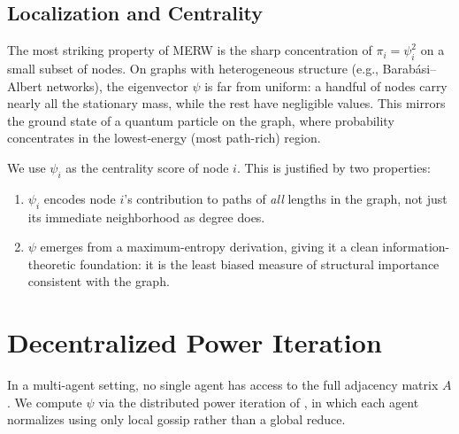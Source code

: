 \documentclass{article}
\begin{document}
\subsection{Localization and Centrality}

The most striking property of MERW is the sharp concentration of $\pi_i = \psi_i^2$ on a small subset of nodes. On graphs with heterogeneous structure (e.g., Barab\'{a}si--Albert networks), the eigenvector $\psi$ is far from uniform: a handful of nodes carry nearly all the stationary mass, while the rest have negligible values. This mirrors the ground state of a quantum particle on the graph, where probability concentrates in the lowest-energy (most path-rich) region.

We use $\psi_i$ as the centrality score of node $i$. This is justified by two properties:
\begin{enumerate}
    \item $\psi_i$ encodes node $i$'s contribution to paths of \emph{all} lengths in the graph, not just its immediate neighborhood as degree does.
    \item $\psi$ emerges from a maximum-entropy derivation, giving it a clean information-theoretic foundation: it is the least biased measure of structural importance consistent with the graph.
\end{enumerate}

\section{Decentralized Power Iteration}
\label{app:poweriter}

In a multi-agent setting, no single agent has access to the full adjacency matrix $A$. We compute $\psi$ via the distributed power iteration of \cite{jelasity2007asynchronous}, in which each agent normalizes using only local gossip rather than a global reduce.
\end{document}
